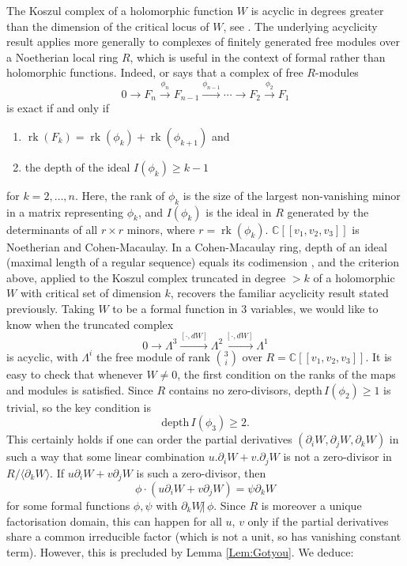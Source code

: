 \documentclass[reqno,10pt]{amsart}
\numberwithin{equation}{section}
\newcommand{\bC}{{\mathbb C}}
\newcommand{\C}{\mathbb{C}}
\newcommand{\rk}{\operatorname{rk}}
\theoremstyle{remark}
\begin{document}
The Koszul complex of a holomorphic function $W$ is acyclic in degrees greater than the dimension of the critical locus of $W$, see  \cite[Ch.~6, Prop.~2.21]{Dimca}. The underlying acyclicity result applies more generally to complexes of finitely generated free modules over a Noetherian local ring $R$, which is useful in the context of formal rather than holomorphic functions.  Indeed, \cite[Corollary 1]{BuchsbaumEisenbud} or \cite[Section 20.3]{Eisenbud} says that a complex of free $R$-modules
\[
0 \rightarrow F_n \xrightarrow{\phi_n} F_{n-1} \xrightarrow{\phi_{n-1}} \cdots \rightarrow F_2 \xrightarrow{\phi_2} F_1
\]
is exact if and only if
\begin{enumerate}
\item $\rk(F_k) = \rk(\phi_k) + \rk(\phi_{k+1})$ and 
\item the depth of the ideal $I(\phi_k) \geq k-1$
\end{enumerate}
 for $k=2,\ldots, n$. Here, the rank of $\phi_k$ is the size of the largest non-vanishing minor in a matrix representing $\phi_k$, and $I(\phi_k)$ is the ideal in $R$ generated by the determinants of all $r\times r$ minors, where $r=\rk(\phi_k)$.  $\C[[v_1,v_2,v_3]]$ is Noetherian \cite[Corollary 10.27]{AtiyahMacDonald} and Cohen-Macaulay.  In a Cohen-Macaulay ring, depth of an ideal (maximal length of a regular sequence) equals its codimension \cite[Theorem 18.2]{Eisenbud}, and the criterion above, applied  to the Koszul complex truncated in degree $> k$ of a holomorphic $W$ with critical set of dimension  $k$, recovers the familiar acyclicity result stated previously. Taking $W$ to be a formal function in 3 variables, we would like to know when the truncated complex
 \[
 0 \rightarrow \Lambda^3 \xrightarrow{[\cdot, dW]} \Lambda^2  \xrightarrow{[\cdot, dW]} \Lambda^1
 \]
 is acyclic, with $\Lambda^i$ the free module of rank ${3 \choose i}$ over $R=\bC[[v_1,v_2,v_3]]$. It is easy to check that whenever $W\neq 0$, the first condition on the ranks of the maps and modules is satisfied.  Since $R$ contains no zero-divisors, depth$\, I(\phi_2) \geq 1$ is trivial, so the key condition is 
 \[
 \textrm{depth} \, I(\phi_3) \geq 2.
 \]
 This certainly holds if one can order the partial derivatives $(\partial_i W, \partial_jW, \partial_kW)$ in such a way that some linear combination $u.\partial_i W+ v.\partial_jW$ is not a zero-divisor in $R/ \langle \partial_k W\rangle$. If $u\partial_iW+ v\partial_jW$ is such a zero-divisor, then
 \[
 \phi \cdot (u\partial_i W + v\partial_jW) = \psi \partial_k W
 \]
 for some formal functions $\phi, \psi$ with $\partial_k W \not| \, \phi$.   Since $R$ is moreover a unique factorisation domain, this can happen for all $u$, $v$  only if the partial derivatives share a common irreducible factor (which is not a unit, so has vanishing constant term). However, this is precluded by Lemma \ref{Lem:Gotyou}.  We deduce:
 
\end{document}

